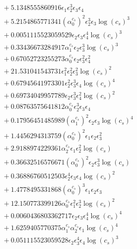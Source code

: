\documentclass[10pt]{article}
\begin{document}
\begin{align*}
&{}  + 5.1348555860916 \epsilon_{1} \epsilon_{2}^{3} \epsilon_{3} \epsilon_{4} \\
&{}  + 5.2154865771341 \left(\alpha_{0}^{c_s}\right)^{2} \epsilon_{2}^{3} \epsilon_{3} \log{\left(c_{s} \right)}^{3} \\
&{}  + 0.0051115523059529 \epsilon_{2} \epsilon_{3} \epsilon_{4}^{4} \log{\left(c_{s} \right)}^{3} \\
&{}  + 0.33436673284917 \alpha_{1}^{c_s} \epsilon_{2} \epsilon_{3}^{3} \log{\left(c_{s} \right)}^{3} \\
&{}  + 0.67052723255273 \alpha_{0}^{c_s} \epsilon_{2} \epsilon_{3}^{2} \epsilon_{4}^{2} \\
&{}  + 21.531041543731 \epsilon_{1}^{2} \epsilon_{2}^{2} \epsilon_{3}^{2} \log{\left(c_{s} \right)}^{2} \\
&{}  + 0.67945641973301 \epsilon_{2}^{2} \epsilon_{3}^{3} \epsilon_{4} \log{\left(c_{s} \right)}^{4} \\
&{}  + 0.69734049957789 \epsilon_{2} \epsilon_{3}^{3} \epsilon_{4}^{2} \log{\left(c_{s} \right)}^{2} \\
&{}  + 0.08763575641812 \alpha_{0}^{c_s} \epsilon_{2}^{3} \epsilon_{3} \epsilon_{4} \\
&{}  + 0.17956451485989 \left(\alpha_{1}^{c_s}\right)^{2} \epsilon_{2} \epsilon_{3} \log{\left(c_{s} \right)}^{4} \\
&{}  + 1.4456294313759 \left(\alpha_{0}^{c_s}\right)^{2} \epsilon_{1} \epsilon_{2} \epsilon_{3}^{2} \\
&{}  + 2.9188974229361 \alpha_{2}^{c_s} \epsilon_{1} \epsilon_{2}^{2} \log{\left(c_{s} \right)} \\
&{}  + 0.36632516576671 \left(\alpha_{0}^{c_s}\right)^{2} \epsilon_{2} \epsilon_{3}^{3} \log{\left(c_{s} \right)} \\
&{}  + 0.36886760512503 \epsilon_{2}^{4} \epsilon_{3} \epsilon_{4} \log{\left(c_{s} \right)}^{2} \\
&{}  + 1.4778495331868 \left(\alpha_{0}^{c_s}\right)^{3} \epsilon_{1} \epsilon_{2} \epsilon_{3} \\
&{}  + 12.150773399126 \alpha_{0}^{c_s} \epsilon_{1}^{2} \epsilon_{2}^{3} \log{\left(c_{s} \right)}^{2} \\
&{}  + 0.0060436803362717 \epsilon_{2} \epsilon_{3} \epsilon_{4}^{4} \log{\left(c_{s} \right)}^{4} \\
&{}  + 1.6259405770375 \alpha_{1}^{c_s} \alpha_{2}^{c_s} \epsilon_{1} \log{\left(c_{s} \right)}^{4} \\
&{}  + 0.051115523059528 \epsilon_{2} \epsilon_{3}^{4} \epsilon_{4} \log{\left(c_{s} \right)}^{3} \\

\end{align*}
\end{document}

